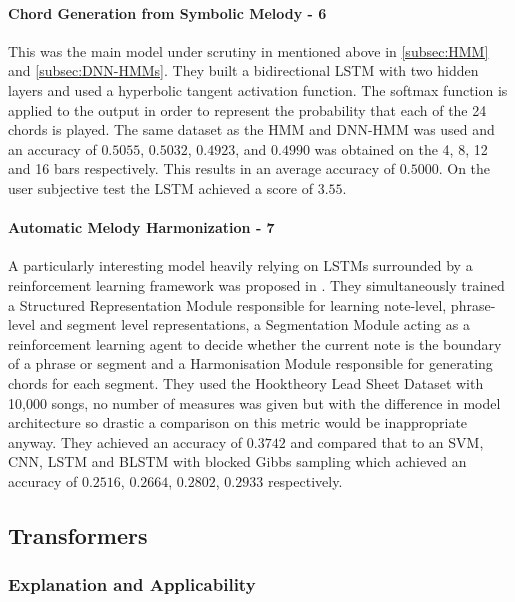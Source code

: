 \paragraph{Chord Generation from Symbolic Melody - 6} This was the main model under scrutiny in  mentioned above in \cref{subsec:HMM} and \cref{subsec:DNN-HMMs}.
They built a bidirectional LSTM with two hidden layers and used a hyperbolic tangent activation function. The softmax function is applied to the output in order to represent the probability that each of the 24 chords is played.
The same dataset as the HMM and DNN-HMM was used and an accuracy of $0.5055$, $0.5032$, $0.4923$, and $0.4990$  was obtained on the 4, 8, 12 and 16 bars respectively. This results in an average accuracy of $0.5000$.
On the user subjective test the LSTM achieved a score of $3.55$.

\paragraph{Automatic Melody Harmonization - 7} A particularly interesting model heavily relying on LSTMs surrounded by a reinforcement learning framework was proposed in .
They simultaneously trained a Structured Representation Module responsible for learning note-level, phrase-level and segment level representations, a Segmentation Module acting as a reinforcement learning agent to decide whether the current note is the boundary of a phrase or segment and a Harmonisation Module responsible for generating chords for each segment.
They used the Hooktheory Lead Sheet Dataset with 10,000 songs, no number of measures was given but with the difference in model architecture so drastic a comparison on this metric would be inappropriate anyway.
They achieved an accuracy of $0.3742$ and compared that to an SVM, CNN, LSTM and BLSTM with blocked Gibbs sampling which achieved an accuracy of $0.2516$, $0.2664$, $0.2802$, $0.2933$ respectively.

\subsection{Transformers}
\label{sec:ModelTransformers}
\subsubsection{Explanation and Applicability}

